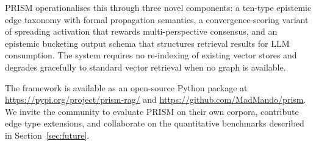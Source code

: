 \documentclass[11pt,a4paper]{article}
\begin{document}
PRISM operationalises this through three novel components: a ten-type
epistemic edge taxonomy with formal propagation semantics, a convergence-scoring
variant of spreading activation that rewards multi-perspective consensus, and an
epistemic bucketing output schema that structures retrieval results for LLM
consumption. The system requires no re-indexing of existing vector stores and
degrades gracefully to standard vector retrieval when no graph is available.

The framework is available as an open-source Python package at
\url{https://pypi.org/project/prism-rag/} and
\url{https://github.com/MadMando/prism}. We invite the community to
evaluate PRISM on their own corpora, contribute edge type extensions,
and collaborate on the quantitative benchmarks described in
Section~\ref{sec:future}.




\end{document}
